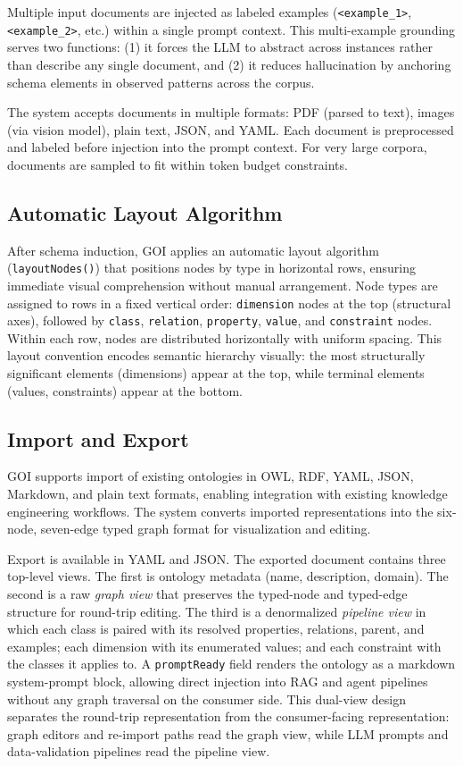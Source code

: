 \documentclass[runningheads,a4paper]{llncs}
\begin{document}
Multiple input documents are injected as labeled examples
(\texttt{<example\_1>}, \texttt{<example\_2>}, etc.) within a single
prompt context. This multi-example grounding serves two functions: (1)
it forces the LLM to abstract across instances rather than describe any
single document, and (2) it reduces hallucination by anchoring schema
elements in observed patterns across the corpus.

The system accepts documents in multiple formats: PDF (parsed to text),
images (via vision model), plain text, JSON, and YAML. Each document is
preprocessed and labeled before injection into the prompt context. For
very large corpora, documents are sampled to fit within token budget
constraints.

\subsection{Automatic Layout Algorithm}

After schema induction, GOI applies an automatic layout algorithm
(\texttt{layoutNodes()}) that positions nodes by type in horizontal
rows, ensuring immediate visual comprehension without manual
arrangement. Node types are assigned to rows in a fixed vertical order:
\texttt{dimension} nodes at the top (structural axes), followed by
\texttt{class}, \texttt{relation}, \texttt{property}, \texttt{value},
and \texttt{constraint} nodes. Within each row, nodes are distributed
horizontally with uniform spacing. This layout convention encodes
semantic hierarchy visually: the most structurally significant elements
(dimensions) appear at the top, while terminal elements (values,
constraints) appear at the bottom.

\subsection{Import and Export}

GOI supports import of existing ontologies in OWL, RDF, YAML, JSON,
Markdown, and plain text formats, enabling integration with existing
knowledge engineering workflows. The system converts imported
representations into the six-node, seven-edge typed graph format for
visualization and editing.

Export is available in YAML and JSON. The exported document contains
three top-level views. The first is ontology metadata (name,
description, domain). The second is a raw \emph{graph view} that
preserves the typed-node and typed-edge structure for round-trip
editing. The third is a denormalized \emph{pipeline view} in which
each class is paired with its resolved properties, relations, parent,
and examples; each dimension with its enumerated values; and each
constraint with the classes it applies to. A \texttt{promptReady}
field renders the ontology as a markdown system-prompt block, allowing
direct injection into RAG and agent pipelines without any graph
traversal on the consumer side. This dual-view design separates the
round-trip representation from the consumer-facing representation:
graph editors and re-import paths read the graph view, while LLM
prompts and data-validation pipelines read the pipeline view.
\end{document}
